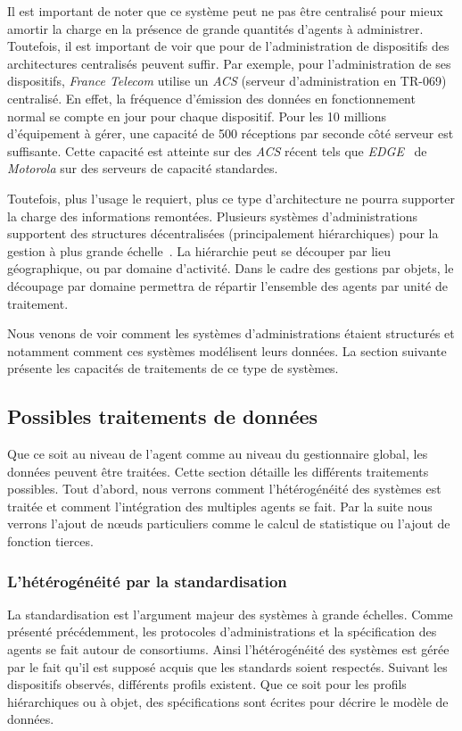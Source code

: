 Il est important de noter que ce système peut ne pas être centralisé pour mieux amortir la charge en la présence de grande quantités d'agents à administrer. Toutefois, il est important de voir que pour de l'administration de dispositifs des architectures centralisés peuvent suffir. Par exemple, pour l'administration de ses dispositifs, \textit{France Telecom} utilise un \textit{ACS} (serveur d'administration en TR-069) centralisé. En effet, la fréquence d'émission des données en fonctionnement normal se compte en jour pour chaque dispositif. Pour les 10 millions d'équipement à gérer, une capacité de 500 réceptions par seconde côté serveur est suffisante. Cette capacité est atteinte sur des \textit{ACS} récent tels que \textit{EDGE}~\cite{Motorola:EDGE} de \textit{Motorola} sur des serveurs de capacité standardes.

Toutefois, plus l'usage le requiert, plus ce type d'architecture ne pourra supporter la charge des informations remontées. Plusieurs systèmes d'administrations supportent des structures décentralisées (principalement hiérarchiques) pour la gestion à plus grande échelle~\cite{Kessis:management}. La hiérarchie peut se découper par lieu géographique, ou par domaine d'activité. Dans le cadre des gestions par objets, le découpage par domaine permettra de répartir l'ensemble des agents par unité de traitement.

Nous venons de voir comment les systèmes d'administrations étaient structurés et notamment comment ces systèmes modélisent leurs données. La section suivante présente les capacités de traitements de ce type de systèmes.

\subsection{Possibles traitements de données}
Que ce soit au niveau de l'agent comme au niveau du gestionnaire global, les données peuvent être traitées. Cette section détaille les différents traitements possibles. Tout d'abord, nous verrons comment l'hétérogénéité des systèmes est traitée et comment l'intégration des multiples agents se fait. Par la suite nous verrons l'ajout de nœuds particuliers comme le calcul de statistique ou l'ajout de fonction tierces.

\subsubsection{L'hétérogénéité par la standardisation}
La standardisation est l'argument majeur des systèmes à grande échelles. Comme présenté précédemment, les protocoles d'administrations et la spécification des agents se fait autour de consortiums. Ainsi l'hétérogénéité des systèmes est gérée par le fait qu'il est supposé acquis que les standards soient respectés. Suivant les dispositifs observés, différents profils existent. Que ce soit pour les profils hiérarchiques ou à objet, des spécifications sont écrites pour décrire le modèle de données.

